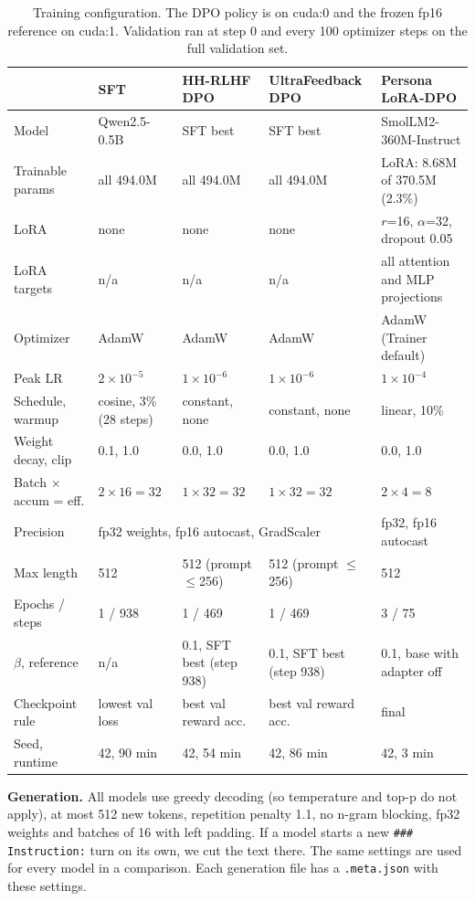 \documentclass[10pt]{article}
\newcommand{\code}[1]{\texttt{\small #1}}
\begin{document}
\begin{table}[h]
\centering\footnotesize
\setlength{\tabcolsep}{2.8pt}
\begin{tabular}{@{}l l l l l@{}}
\toprule
 & SFT & HH-RLHF DPO & UltraFeedback DPO & Persona LoRA-DPO \\
\midrule
Model & Qwen2.5-0.5B & SFT best & SFT best & SmolLM2-360M-Instruct \\
Trainable params & all 494.0M & all 494.0M & all 494.0M & LoRA: 8.68M of 370.5M (2.3\%) \\
LoRA & none & none & none & $r$=16, $\alpha$=32, dropout 0.05 \\
LoRA targets & n/a & n/a & n/a & all attention and MLP projections \\
Optimizer & AdamW & AdamW & AdamW & AdamW (Trainer default) \\
Peak LR & $2\times10^{-5}$ & $1\times10^{-6}$ & $1\times10^{-6}$ & $1\times10^{-4}$ \\
Schedule, warmup & cosine, 3\% (28 steps) & constant, none & constant, none & linear, 10\% \\
Weight decay, clip & 0.1, 1.0 & 0.0, 1.0 & 0.0, 1.0 & 0.0, 1.0 \\
Batch $\times$ accum = eff. & $2\times16=32$ & $1\times32=32$ & $1\times32=32$ & $2\times4=8$ \\
Precision & \multicolumn{3}{l}{fp32 weights, fp16 autocast, GradScaler} & fp32, fp16 autocast \\
Max length & 512 & 512 (prompt $\le$256) & 512 (prompt $\le$256) & 512 \\
Epochs / steps & 1 / 938 & 1 / 469 & 1 / 469 & 3 / 75 \\
$\beta$, reference & n/a & 0.1, SFT best (step 938) & 0.1, SFT best (step 938) & 0.1, base with adapter off \\
Checkpoint rule & lowest val loss & best val reward acc. & best val reward acc. & final \\
Seed, runtime & 42, 90 min & 42, 54 min & 42, 86 min & 42, 3 min \\
\bottomrule
\end{tabular}
\caption{Training configuration. The DPO policy is on cuda:0 and the frozen fp16 reference on cuda:1. Validation ran at step 0 and every 100 optimizer steps on the full validation set.}
\label{tab:config}
\end{table}

\textbf{Generation.} All models use greedy decoding (so temperature and top-p do not apply), at most 512 new tokens,
repetition penalty 1.1, no n-gram blocking, fp32 weights and batches of 16 with left padding. If a model starts a new
\code{\#\#\# Instruction:} turn on its own, we cut the text there. The same settings are used for every model in a
comparison. Each generation file has a \code{.meta.json} with these settings.
\end{document}
